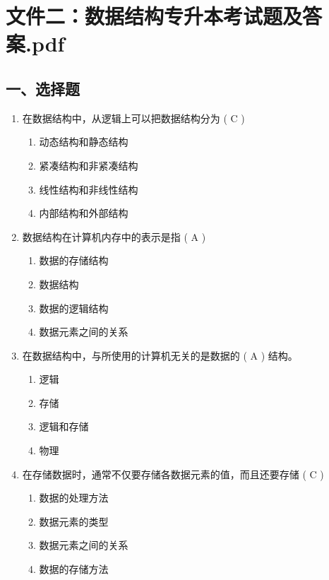 \documentclass[12pt, a4paper]{article}
\begin{document}
\section{文件二：数据结构专升本考试题及答案.pdf}

\subsection*{一、选择题}

\begin{enumerate}[label=\arabic*.]
    \item 在数据结构中，从逻辑上可以把数据结构分为 ( C )
    \begin{enumerate}
        \item 动态结构和静态结构
        \item 紧凑结构和非紧凑结构
        \item 线性结构和非线性结构
        \item 内部结构和外部结构
    \end{enumerate}

    \item 数据结构在计算机内存中的表示是指 ( A )
    \begin{enumerate}
        \item 数据的存储结构
        \item 数据结构
        \item 数据的逻辑结构
        \item 数据元素之间的关系
    \end{enumerate}

    \item 在数据结构中，与所使用的计算机无关的是数据的 ( A ) 结构。
    \begin{enumerate}
        \item 逻辑
        \item 存储
        \item 逻辑和存储
        \item 物理
    \end{enumerate}

    \item 在存储数据时，通常不仅要存储各数据元素的值，而且还要存储 ( C )
    \begin{enumerate}
        \item 数据的处理方法
        \item 数据元素的类型
        \item 数据元素之间的关系
        \item 数据的存储方法
    \end{enumerate}


\end{enumerate}
\end{document}
